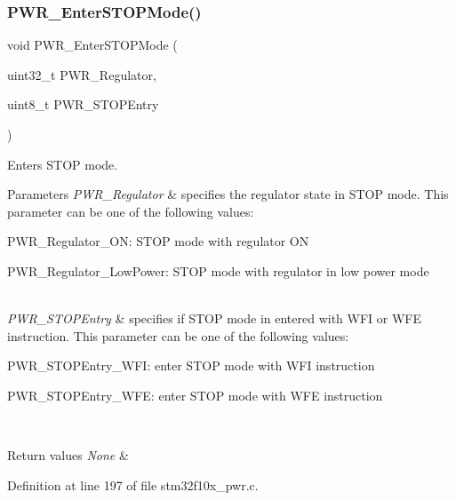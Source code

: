 \subsubsection{\texorpdfstring{P\+W\+R\+\_\+\+Enter\+S\+T\+O\+P\+Mode()}{PWR\_EnterSTOPMode()}}
{\footnotesize\ttfamily void P\+W\+R\+\_\+\+Enter\+S\+T\+O\+P\+Mode (\begin{DoxyParamCaption}\item[{uint32\+\_\+t}]{P\+W\+R\+\_\+\+Regulator,  }\item[{uint8\+\_\+t}]{P\+W\+R\+\_\+\+S\+T\+O\+P\+Entry }\end{DoxyParamCaption})}



Enters S\+T\+OP mode. 


\begin{DoxyParams}{Parameters}
{\em P\+W\+R\+\_\+\+Regulator} & specifies the regulator state in S\+T\+OP mode. This parameter can be one of the following values\+: \begin{DoxyItemize}
\item P\+W\+R\+\_\+\+Regulator\+\_\+\+ON\+: S\+T\+OP mode with regulator ON \item P\+W\+R\+\_\+\+Regulator\+\_\+\+Low\+Power\+: S\+T\+OP mode with regulator in low power mode \end{DoxyItemize}
\\
\hline
{\em P\+W\+R\+\_\+\+S\+T\+O\+P\+Entry} & specifies if S\+T\+OP mode in entered with W\+FI or W\+FE instruction. This parameter can be one of the following values\+: \begin{DoxyItemize}
\item P\+W\+R\+\_\+\+S\+T\+O\+P\+Entry\+\_\+\+W\+FI\+: enter S\+T\+OP mode with W\+FI instruction \item P\+W\+R\+\_\+\+S\+T\+O\+P\+Entry\+\_\+\+W\+FE\+: enter S\+T\+OP mode with W\+FE instruction \end{DoxyItemize}
\\
\hline
\end{DoxyParams}

\begin{DoxyRetVals}{Return values}
{\em None} & \\
\hline
\end{DoxyRetVals}


Definition at line 197 of file stm32f10x\+\_\+pwr.\+c.

\mbox{\label{group___p_w_r___private___functions_gaa980163a4d83304280ee34942464b4ec}} 
